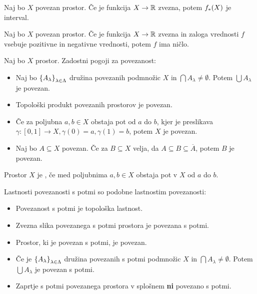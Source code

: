 \begin{izrek}
    Naj bo $X$ povezan prostor. Če je funkcija $X \to \mathbb{R}$ zvezna, potem $f_{*}(X)$ je interval.
\end{izrek}

\begin{posledica}
    Naj bo $X$ povezan prostor. Če je funkcija $X \to \mathbb{R}$ zvezna in zaloga vrednosti $f$ vsebuje pozitivne in negativne vrednosti, potem $f$ ima ničlo.
\end{posledica}

\begin{izrek}
    Naj bo $X$ prostor. Zadostni pogoji za povezanost:
    \begin{itemize}
        \item Naj bo $\left\{A_\lambda\right\}_{\lambda \in \Lambda}$ družina povezanih podmnožic $X$ in $\bigcap A_\lambda \neq \emptyset$. Potem $\bigcup A_\lambda$ je povezan.
        \item Topološki produkt povezanih prostorov je povezan.
        \item Če za poljubna $a,b \in X$ obstaja pot od $a$ do $b$, kjer  je preslikava $\gamma: [0,1] \to X, \gamma(0) = a, \gamma(1) = b$, potem $X$ je povezan.
        \item Naj bo $A \subseteq X$ povezan. Če za $B \subseteq X$ velja, da $A \subseteq B \subseteq \overline{A}$, potem $B$ je povezan.
    \end{itemize}
\end{izrek}

\begin{definicija}
    Prostor $X$ je , če med poljubnima $a, b \in X$ obstaja pot v $X$ od $a$ do $b$.
\end{definicija}

Lastnosti povezanosti s potmi so podobne lastnostim povezanosti:
\begin{itemize}
    \item Povezanost s potmi je topološka lastnost.
    \item Zvezna slika povezanega s potmi prostora je povezana s potmi.
    \item Prostor, ki je povezan s potmi, je povezan.
    \item Če je $\left\{A_\lambda\right\}_{\lambda \in \Lambda}$ družina povezanih s potmi podmnožic $X$ in $\bigcap A_\lambda \neq \emptyset$. Potem $\bigcup A_\lambda$ je povezan s potmi.
    \item Zaprtje s potmi povezanega prostora v splošnem \textbf{ni} povezano s potmi.
\end{itemize}

